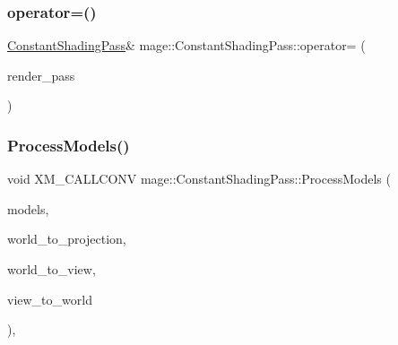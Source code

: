 \hypertarget{classmage_1_1_constant_shading_pass_ae5ea38d9739b1a16257ee0a69c95b406}{}\label{classmage_1_1_constant_shading_pass_ae5ea38d9739b1a16257ee0a69c95b406} 
\subsubsection{\texorpdfstring{operator=()}{operator=()}\hspace{0.1cm}{\footnotesize\ttfamily [2/2]}}
{\footnotesize\ttfamily \hyperlink{classmage_1_1_constant_shading_pass}{Constant\+Shading\+Pass}\& mage\+::\+Constant\+Shading\+Pass\+::operator= (\begin{DoxyParamCaption}\item[{\hyperlink{classmage_1_1_constant_shading_pass}{Constant\+Shading\+Pass} \&\&}]{render\+\_\+pass }\end{DoxyParamCaption})\hspace{0.3cm}{\ttfamily [delete]}}

\hypertarget{classmage_1_1_constant_shading_pass_a74efecf100ea18251d9e5acde63dd242}{}\label{classmage_1_1_constant_shading_pass_a74efecf100ea18251d9e5acde63dd242} 
\subsubsection{\texorpdfstring{Process\+Models()}{ProcessModels()}}
{\footnotesize\ttfamily void X\+M\+\_\+\+C\+A\+L\+L\+C\+O\+NV mage\+::\+Constant\+Shading\+Pass\+::\+Process\+Models (\begin{DoxyParamCaption}\item[{const vector$<$ const \hyperlink{classmage_1_1_model_node}{Model\+Node} $\ast$ $>$ \&}]{models,  }\item[{F\+X\+M\+M\+A\+T\+R\+IX}]{world\+\_\+to\+\_\+projection,  }\item[{F\+X\+M\+M\+A\+T\+R\+IX}]{world\+\_\+to\+\_\+view,  }\item[{F\+X\+M\+M\+A\+T\+R\+IX}]{view\+\_\+to\+\_\+world }\end{DoxyParamCaption})\hspace{0.3cm}{\ttfamily [private]}, {\ttfamily [noexcept]}}

